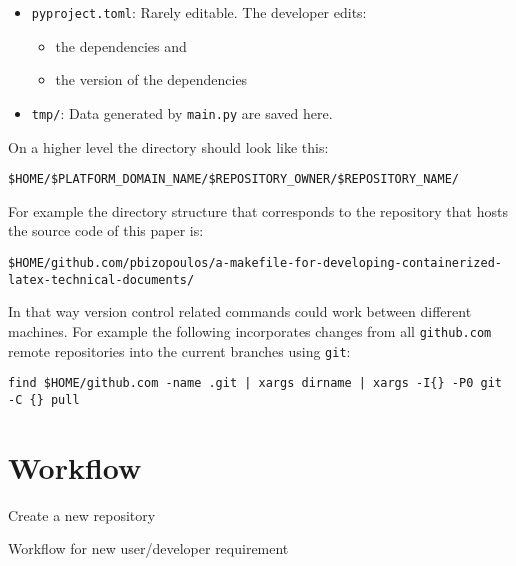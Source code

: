 \documentclass[journal]{IEEEtran}
\begin{document}
\begin{itemize}
	\item \texttt{pyproject.toml}: Rarely editable. The developer edits:
		\begin{itemize}
			\item the dependencies and
			\item the version of the dependencies
		\end{itemize}
	\item \texttt{tmp/}: Data generated by \texttt{main.py} are saved here.
\end{itemize}

On a higher level the directory should look like this:
\begin{verbatim}
$HOME/$PLATFORM_DOMAIN_NAME/$REPOSITORY_OWNER/$REPOSITORY_NAME/
\end{verbatim}

For example the directory structure that corresponds to the repository that hosts the source code of this paper is:
\begin{verbatim}
$HOME/github.com/pbizopoulos/a-makefile-for-developing-containerized-latex-technical-documents/
\end{verbatim}

In that way version control related commands could work between different machines. For example the following incorporates changes from all \texttt{github.com} remote repositories into the current branches using \texttt{git}:
\begin{verbatim}
find $HOME/github.com -name .git | xargs dirname | xargs -I{} -P0 git -C {} pull
\end{verbatim}

\section{Workflow}

\begin{algorithm}
	Create a new repository\;
	\Return{}
	\caption{Workflow for new user/developer requirement}
\end{algorithm}



\end{document}
